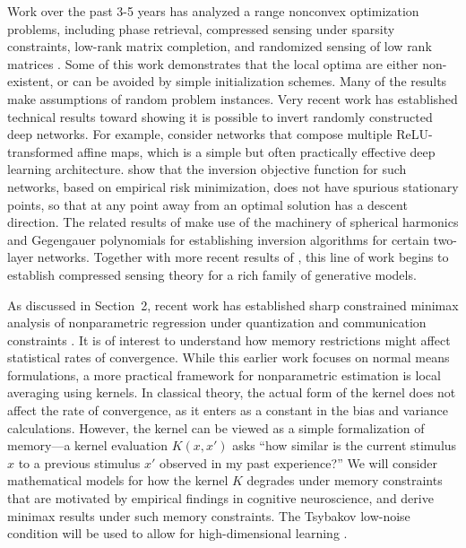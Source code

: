 Work over the past 3-5 years has analyzed a range nonconvex
optimization problems, including phase retrieval, compressed
sensing under sparsity constraints, low-rank matrix
completion, and randomized sensing of low rank matrices
\cite{phaselift_1,phaselift_2,phaselift_3,ZhaWanLiu15,WeiCaiCha16,ZheLaf15,phaselift_1,phaselift_2,phaselift_3,ZhaWanLiu15,WeiCaiCha16}.
Some of this work demonstrates that the local optima are either
non-existent, or can be avoided by simple initialization schemes. Many
of the results make assumptions of random problem instances.  Very
recent work has established technical results toward showing it is
possible to invert randomly constructed deep networks. For example,
\cite{HandV17} consider networks that compose multiple ReLU-transformed affine
maps, which is a simple but often practically effective deep learning
architecture.  
\cite{HandV17} show that the inversion objective function for such networks, based
on empirical risk minimization, does not have spurious stationary
points, so that at any point away from an optimal solution has a
descent direction. The related results of \cite{Mixon18} make use of
the machinery of spherical harmonics and Gegengauer polynomials for
establishing inversion algorithms for certain two-layer
networks. Together with more recent results of \cite{HandV18}, this
line of work begins to establish compressed sensing theory for a rich
family of generative models.


As discussed in Section~2, recent work has established 
sharp constrained minimax analysis of nonparametric
regression under quantization and communication constraints \citep{Zhu:18,Zhu:18b}.
It is of interest to understand how memory restrictions might affect
statistical rates of convergence. While this earlier work focuses on
normal means formulations, a more practical framework for
nonparametric estimation is local averaging using kernels. In
classical theory, the actual form of the kernel does not affect the
rate of convergence, as it enters as a constant in the bias and
variance calculations. However, the kernel can be viewed as a
simple formalization of memory---a kernel evaluation $K(x,x')$ asks
``how similar is the current stimulus $x$ to a previous stimulus $x'$
observed in my past experience?'' We will consider mathematical models for
how the kernel $K$ degrades under memory constraints that
are motivated by empirical findings in cognitive neuroscience,
and derive minimax results under such memory constraints. The
Tsybakov low-noise condition will be used to allow for
high-dimensional learning \citep{mammen1999,tsybakov2004,audibert2007}.




